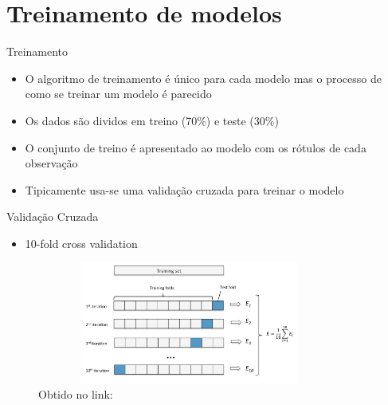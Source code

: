 \section{Treinamento de modelos}

\begin{frame}	
	\begin{block}{Treinamento}	
		\begin{itemize}
			\item O algoritmo de treinamento é único para cada modelo mas o processo  de como se treinar um modelo é parecido
			\item Os dados são dividos em treino (70\%) e teste (30\%)
			\item O conjunto de treino é apresentado ao modelo com os rótulos de cada observação
			\item Tipicamente usa-se uma validação cruzada para treinar o modelo
		\end{itemize}		
	\end{block}
\end{frame}

\begin{frame}	
	\begin{block}{Validação Cruzada}	
		\begin{itemize}
			\item 10-fold cross validation
		\end{itemize}
				\begin{figure}[!htb]
			\centering	
			\includegraphics[height=4cm, width = 10cm]{./pic/kfold.png}
			\caption{Obtido no link: \href{https://github.com/rasbt/python-machine-learning-book}{\color{blue}{ python-machine-learning-book } }}
			\label{fig_matriz_confusao}
		\end{figure}	
	\end{block}
\end{frame}


